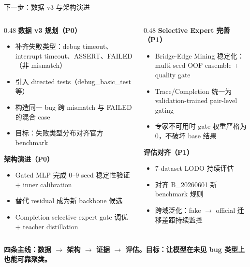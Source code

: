 \documentclass[aspectratio=169,UTF8]{ctexbeamer}
\newcommand{\key}[1]{\textcolor{ICCADBlue}{\textbf{#1}}}
\begin{document}
\begin{frame}{下一步：数据 v3 与架构演进}
  \small
  \begin{columns}[T]
    \begin{column}{0.48\textwidth}
      \textbf{数据 v3 规划（P0）}
      \begin{itemize}
        \item 补齐失败类型：debug timeout、interrupt timeout、ASSERT、FAILED（非 mismatch）
        \item 引入 directed tests（debug\_basic\_test 等）
        \item 构造同一 bug 跨 mismatch 与 FAILED 的混合 case
        \item 目标：失败类型分布对齐官方 benchmark
      \end{itemize}
      \vspace{2mm}
      \textbf{架构演进（P0）}
      \begin{itemize}
        \item Gated MLP 完成 0--9 seed 稳定性验证 + inner calibration
        \item 替代 residual 成为新 backbone 候选
        \item Completion selective expert gate 调优 + teacher distillation
      \end{itemize}
    \end{column}
    \begin{column}{0.48\textwidth}
      \textbf{Selective Expert 完善（P1）}
      \begin{itemize}
        \item Bridge-Edge Mining 稳定化：multi-seed OOF ensemble + quality gate
        \item Trace/Completion 统一为 validation-trained pair-level gating
        \item 专家不可用时 gate 权重严格为 0，不破坏 base 结果
      \end{itemize}
      \vspace{2mm}
      \textbf{评估对齐（P1）}
      \begin{itemize}
        \item 7-dataset LODO 持续评估
        \item 对齐 B\_20260601 新 benchmark 规则
        \item 跨域泛化：fake $\to$ official 迁移差距持续监控
      \end{itemize}
    \end{column}
  \end{columns}

  \vspace{3mm}
  \begin{center}
    \key{四条主线：数据 $\to$ 架构 $\to$ 证据 $\to$ 评估。目标：让模型在未见 bug 类型上也能可靠聚类。}
  \end{center}
\end{frame}
\end{document}
